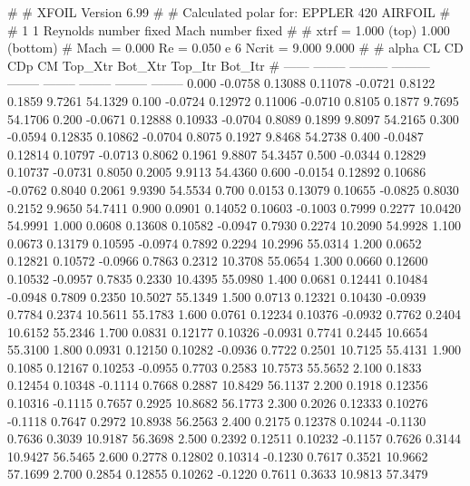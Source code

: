 #  
#       XFOIL         Version 6.99
#  
# Calculated polar for: EPPLER 420 AIRFOIL                              
#  
# 1 1 Reynolds number fixed          Mach number fixed         
#  
# xtrf =   1.000 (top)        1.000 (bottom)  
# Mach =   0.000     Re =     0.050 e 6     Ncrit =   9.000  9.000
#  
#   alpha    CL        CD       CDp       CM     Top_Xtr  Bot_Xtr  Top_Itr  Bot_Itr
#  ------ -------- --------- --------- -------- -------- -------- -------- --------
   0.000  -0.0758   0.13088   0.11078  -0.0721   0.8122   0.1859   9.7261  54.1329
   0.100  -0.0724   0.12972   0.11006  -0.0710   0.8105   0.1877   9.7695  54.1706
   0.200  -0.0671   0.12888   0.10933  -0.0704   0.8089   0.1899   9.8097  54.2165
   0.300  -0.0594   0.12835   0.10862  -0.0704   0.8075   0.1927   9.8468  54.2738
   0.400  -0.0487   0.12814   0.10797  -0.0713   0.8062   0.1961   9.8807  54.3457
   0.500  -0.0344   0.12829   0.10737  -0.0731   0.8050   0.2005   9.9113  54.4360
   0.600  -0.0154   0.12892   0.10686  -0.0762   0.8040   0.2061   9.9390  54.5534
   0.700   0.0153   0.13079   0.10655  -0.0825   0.8030   0.2152   9.9650  54.7411
   0.900   0.0901   0.14052   0.10603  -0.1003   0.7999   0.2277  10.0420  54.9991
   1.000   0.0608   0.13608   0.10582  -0.0947   0.7930   0.2274  10.2090  54.9928
   1.100   0.0673   0.13179   0.10595  -0.0974   0.7892   0.2294  10.2996  55.0314
   1.200   0.0652   0.12821   0.10572  -0.0966   0.7863   0.2312  10.3708  55.0654
   1.300   0.0660   0.12600   0.10532  -0.0957   0.7835   0.2330  10.4395  55.0980
   1.400   0.0681   0.12441   0.10484  -0.0948   0.7809   0.2350  10.5027  55.1349
   1.500   0.0713   0.12321   0.10430  -0.0939   0.7784   0.2374  10.5611  55.1783
   1.600   0.0761   0.12234   0.10376  -0.0932   0.7762   0.2404  10.6152  55.2346
   1.700   0.0831   0.12177   0.10326  -0.0931   0.7741   0.2445  10.6654  55.3100
   1.800   0.0931   0.12150   0.10282  -0.0936   0.7722   0.2501  10.7125  55.4131
   1.900   0.1085   0.12167   0.10253  -0.0955   0.7703   0.2583  10.7573  55.5652
   2.100   0.1833   0.12454   0.10348  -0.1114   0.7668   0.2887  10.8429  56.1137
   2.200   0.1918   0.12356   0.10316  -0.1115   0.7657   0.2925  10.8682  56.1773
   2.300   0.2026   0.12333   0.10276  -0.1118   0.7647   0.2972  10.8938  56.2563
   2.400   0.2175   0.12378   0.10244  -0.1130   0.7636   0.3039  10.9187  56.3698
   2.500   0.2392   0.12511   0.10232  -0.1157   0.7626   0.3144  10.9427  56.5465
   2.600   0.2778   0.12802   0.10314  -0.1230   0.7617   0.3521  10.9662  57.1699
   2.700   0.2854   0.12855   0.10262  -0.1220   0.7611   0.3633  10.9813  57.3479

